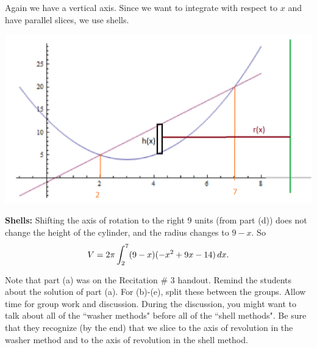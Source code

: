 \documentclass[noinstructornotes]{ximera}
\begin{document}
\begin{problem}
\begin{enumerate}
\begin{freeResponse}
		
		
		Again we have a vertical axis.  Since we want to integrate with respect to $x$ and have parallel slices, we use shells.
		
		\begin{image}
		\includegraphics[scale=0.6]{Figure6-4-15.png}
		\end{image}
		
		{\bf Shells: }
		Shifting the axis of rotation to the right 9 units (from part (d)) does not change the height of the cylinder, and the radius changes to $9-x$.
		So
			\[
			V = 2 \pi \int_2^7 (9-x) (-x^2 + 9x - 14) \,d x.
			\]
			
		
		

		\end{freeResponse}
		
	\end{enumerate}
	
\end{problem}

\begin{instructorNotes}
Note that part (a) was on the Recitation \# 3 handout. Remind the students about the solution of part (a). 
For (b)-(e), split these between the groups. Allow time for group work and discussion.   
During the discussion, you might want to talk about all of the ``washer methods" before all of the ``shell methods".  
Be sure that they recognize (by the end) that we slice  to the axis of revolution in the washer method and  to the axis of revolution in the shell method.
\end{instructorNotes}


















	
	
	
	
	
	
	
	
	

	










								
				
				
	
\end{document}
